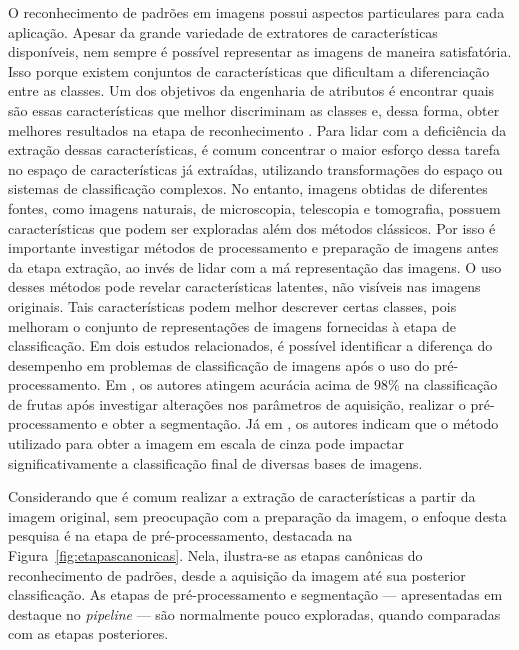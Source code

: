 O reconhecimento de padrões em imagens possui aspectos particulares para cada aplicação. Apesar da grande variedade de extratores de características disponíveis, nem sempre é possível representar as imagens de maneira satisfatória. Isso porque existem conjuntos de características que dificultam a diferenciação entre as classes. Um dos objetivos da engenharia de atributos é encontrar quais são essas características que melhor discriminam as classes e, dessa forma, obter melhores resultados na etapa de reconhecimento \cite{Kubat1998}. Para lidar com a deficiência da extração dessas características, é comum concentrar o maior esforço dessa tarefa no espaço de características já extraídas, utilizando transformações do espaço ou sistemas de classificação complexos. No entanto, imagens obtidas de diferentes fontes, como imagens naturais, de microscopia, telescopia e tomografia, possuem características que podem ser exploradas além dos métodos clássicos. Por isso é importante investigar métodos de processamento e preparação de imagens antes da etapa extração, ao invés de lidar com a má representação das imagens. O uso desses métodos pode revelar características latentes, não visíveis nas imagens originais. Tais características podem melhor descrever certas classes, pois melhoram o conjunto de representações de imagens fornecidas à etapa de classificação. Em dois estudos relacionados, é possível identificar a diferença do desempenho em problemas de classificação de imagens após o uso do pré-processamento. Em , os autores atingem acurácia acima de 98\% na classificação de frutas após investigar alterações nos parâmetros de aquisição, realizar o pré-processamento e obter a segmentação. Já em , os autores indicam que o método utilizado para obter a imagem em escala de cinza pode impactar significativamente a classificação final de diversas bases de imagens.

Considerando que é comum realizar a extração de características a partir da imagem original, sem preocupação com a preparação da imagem, o enfoque desta pesquisa é na etapa de pré-processamento, destacada na Figura~\ref{fig:etapascanonicas}. Nela, ilustra-se as etapas canônicas do reconhecimento de padrões, desde a aquisição da imagem até sua posterior classificação. As etapas de pré-processamento e segmentação --- apresentadas em destaque no \textit{pipeline} --- são normalmente pouco exploradas, quando comparadas com as etapas posteriores.

